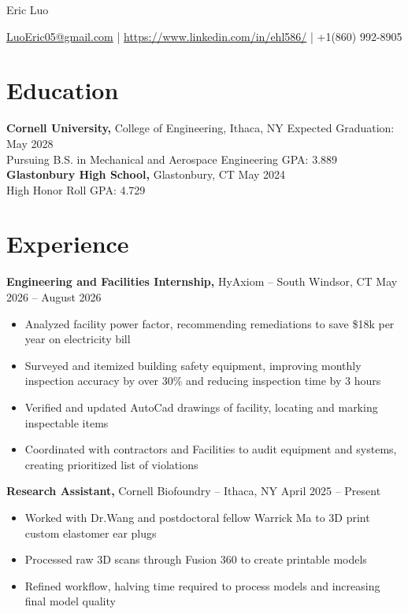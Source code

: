 \documentclass[12pt]{article}       %
\begin{document}
\centerline{\Huge Eric Luo}

\vspace{4pt}

\centerline{\href{mailto:LuoEric05@gmail.com}{LuoEric05@gmail.com} |
  \href{www.linkedin.com/in/ehl586} {https://www.linkedin.com/in/ehl586/} | {+1(860) 992-8905}}

\vspace{-20pt}

\section*{Education}
\textbf{Cornell University,} College of Engineering, Ithaca, NY \hfill Expected Graduation: May 2028 \\
Pursuing B.S. in Mechanical and Aerospace Engineering  \hfill GPA: 3.889 \\
\textbf{Glastonbury High School,} Glastonbury, CT \hfill May 2024 \\
High Honor Roll \hfill GPA: 4.729
\vspace{-12.5pt}

\section*{Experience}
\textbf{Engineering and Facilities Internship,} {HyAxiom} -- South Windsor, CT \hfill May 2026 -- August 2026
\\
\vspace{-9pt}
\begin{itemize}
  \item Analyzed facility power factor, recommending remediations to save \$18k per
        year on electricity bill
  \item Surveyed and itemized building safety equipment, improving monthly inspection
        accuracy by over 30\% and reducing inspection time by 3 hours
  \item Verified and updated AutoCad drawings of facility, locating and marking
        inspectable items
  \item Coordinated with contractors and Facilities to audit equipment and systems,
        creating prioritized list of violations
\end{itemize}
\textbf{Research Assistant,} {Cornell Biofoundry} -- Ithaca, NY \hfill April 2025 -- Present
\\
\vspace{-9pt}
\begin{itemize}
  \item Worked with Dr.Wang and postdoctoral fellow Warrick Ma to 3D print custom
        elastomer ear plugs
  \item Processed raw 3D scans through Fusion 360 to create printable models
  \item Refined workflow, halving time required to process models and increasing final
        model quality
\end{itemize}
\end{document}
